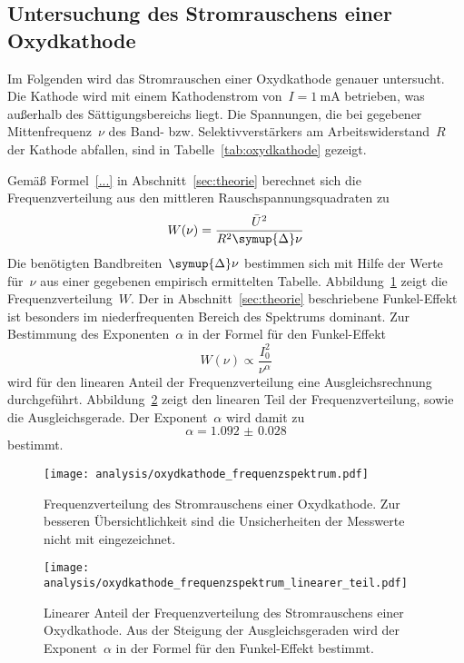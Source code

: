 \subsection{Untersuchung des Stromrauschens einer Oxydkathode}

Im Folgenden wird das Stromrauschen einer Oxydkathode genauer untersucht. Die
Kathode wird mit einem Kathodenstrom von~$I=\SI{1}{\milli\ampere}$ betrieben,
was außerhalb des Sättigungsbereichs liegt. Die Spannungen, die bei gegebener
Mittenfrequenz~$\nu$ des Band- bzw. Selektivverstärkers am Arbeitswiderstand~$R$
der Kathode abfallen, sind in Tabelle~\ref{tab:oxydkathode} gezeigt.

Gemäß Formel~\ref{...} in Abschnitt~\ref{sec:theorie} berechnet sich die
Frequenzverteilung aus den mittleren Rauschspannungsquadraten zu
%
\begin{equation}
  W(\nu)=\frac{\bar{U}^2}{R^2\symup{\Delta}\nu}
\end{equation}
%
Die benötigten Bandbreiten~$\symup{\Delta}\nu$ bestimmen sich mit Hilfe der
Werte für~$\nu$ aus einer gegebenen empirisch ermittelten Tabelle.
Abbildung~\ref{fig:oxydkathode_frequenzspektrum} zeigt die
Frequenzverteilung~$W$. Der in Abschnitt~\ref{sec:theorie} beschriebene
Funkel-Effekt ist besonders im niederfrequenten Bereich des Spektrums dominant.
Zur Bestimmung des Exponenten~$\alpha$ in der Formel für den Funkel-Effekt
%
\begin{equation}
  W(\nu)\propto\frac{I_0^2}{\nu^{\alpha}}
\end{equation}
%
wird für den linearen Anteil der Frequenzverteilung eine Ausgleichsrechnung
durchgeführt. Abbildung~\ref{fig:oxydkathode_frequenzspektrum_linearer_teil}
zeigt den linearen Teil der Frequenzverteilung, sowie die Ausgleichsgerade. Der
Exponent~$\alpha$ wird damit zu
%
\begin{equation}
  \alpha=\num{1.092(28)}
\end{equation}
%
bestimmt.

\begin{figure}
  \texttt{[image: analysis/oxydkathode\_frequenzspektrum.pdf]}
  \caption{Frequenzverteilung des Stromrauschens einer Oxydkathode. Zur besseren
  Übersichtlichkeit sind die Unsicherheiten der Messwerte nicht mit
  eingezeichnet.}
  \label{fig:oxydkathode_frequenzspektrum}
\end{figure}

\begin{figure}
  \texttt{[image: analysis/oxydkathode\_frequenzspektrum\_linearer\_teil.pdf]}
  \caption{Linearer Anteil der Frequenzverteilung des Stromrauschens einer
  Oxydkathode. Aus der Steigung der Ausgleichsgeraden wird der Exponent~$\alpha$
  in der Formel für den Funkel-Effekt bestimmt.}
  \label{fig:oxydkathode_frequenzspektrum_linearer_teil}
\end{figure}

